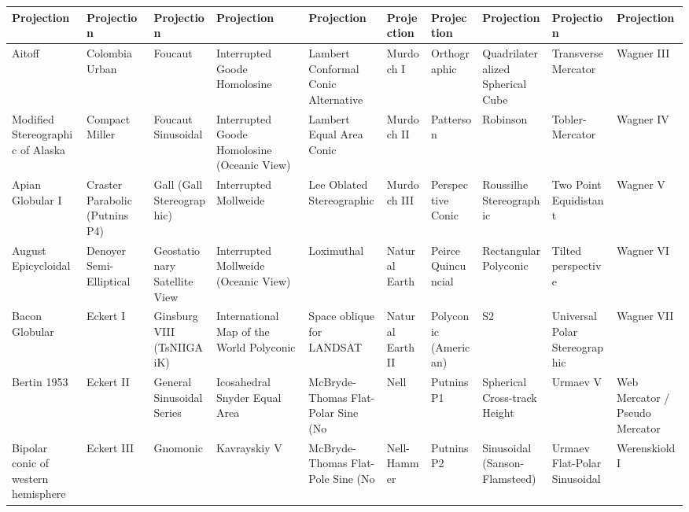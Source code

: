 \documentclass[11pt,dvipsnames,ignorenonframetext,aspectratio=169]{beamer}
\begin{document}
\begin{frame}{}
\protect\hypertarget{section-4}{}
\setlength{\tabcolsep}{2pt}

\begin{table}
\centering\begingroup\fontsize{4}{6}\selectfont

\begin{tabular}{>{\raggedright\arraybackslash}p{9em}>{\raggedright\arraybackslash}p{9em}>{\raggedright\arraybackslash}p{9em}>{\raggedright\arraybackslash}p{9em}>{\raggedright\arraybackslash}p{9em}>{\raggedright\arraybackslash}p{9em}>{\raggedright\arraybackslash}p{9em}>{\raggedright\arraybackslash}p{9em}>{\raggedright\arraybackslash}p{9em}>{\raggedright\arraybackslash}p{9em}}
\toprule
Projection & Projection & Projection & Projection & Projection & Projection & Projection & Projection & Projection & Projection\\
\midrule
Aitoff & Colombia Urban & Foucaut & Interrupted Goode Homolosine & Lambert Conformal Conic Alternative & Murdoch I & Orthographic & Quadrilateralized Spherical Cube & Transverse Mercator & Wagner III\\
Modified Stereographic of Alaska & Compact Miller & Foucaut Sinusoidal & Interrupted Goode Homolosine (Oceanic View) & Lambert Equal Area Conic & Murdoch II & Patterson & Robinson & Tobler-Mercator & Wagner IV\\
Apian Globular I & Craster Parabolic (Putnins P4) & Gall (Gall Stereographic) & Interrupted Mollweide & Lee Oblated Stereographic & Murdoch III & Perspective Conic & Roussilhe Stereographic & Two Point Equidistant & Wagner V\\
August Epicycloidal & Denoyer Semi-Elliptical & Geostationary Satellite View & Interrupted Mollweide (Oceanic View) & Loximuthal & Natural Earth & Peirce Quincuncial & Rectangular Polyconic & Tilted perspective & Wagner VI\\
Bacon Globular & Eckert I & Ginsburg VIII (TsNIIGAiK) & International Map of the World Polyconic & Space oblique for LANDSAT & Natural Earth II & Polyconic (American) & S2 & Universal Polar Stereographic & Wagner VII\\
\addlinespace
Bertin 1953 & Eckert II & General Sinusoidal Series & Icosahedral Snyder Equal Area & McBryde-Thomas Flat-Polar Sine (No & Nell & Putnins P1 & Spherical Cross-track Height & Urmaev V & Web Mercator / Pseudo Mercator\\
Bipolar conic of western hemisphere & Eckert III & Gnomonic & Kavrayskiy V & McBryde-Thomas Flat-Pole Sine (No & Nell-Hammer & Putnins P2 & Sinusoidal (Sanson-Flamsteed) & Urmaev Flat-Polar Sinusoidal & Werenskiold I\\

\end{tabular}
\end{table}
\end{frame}
\end{document}
